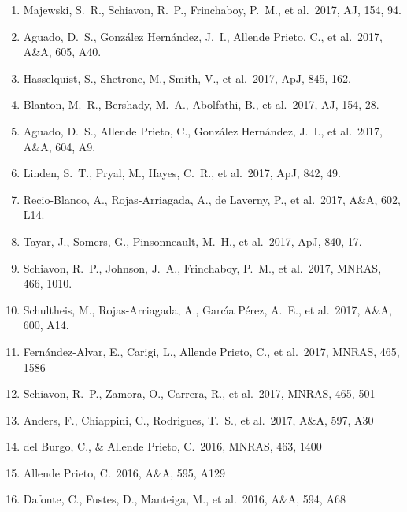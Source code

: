 \documentclass[12pt]{article}
\newcommand{\aj}{AJ}
\newcommand{\apj}{ApJ}
\newcommand{\mnras}{MNRAS}
\newcommand{\aap}{A\&A}
\begin{document}
\begin{enumerate}
\item Majewski, S.~R., Schiavon, R.~P., Frinchaboy, P.~M., et al.\ 2017, \aj, 154, 94.

\item Aguado, D.~S., Gonz{\'a}lez Hern{\'a}ndez, J.~I., Allende Prieto, C., et al.\ 2017, \aap, 605, A40. 

\item Hasselquist, S., Shetrone, M., Smith, V., et al.\ 2017, \apj, 845, 162. 

\item Blanton, M.~R., Bershady, M.~A., Abolfathi, B., et al.\ 2017, \aj, 154, 28. 

\item Aguado, D.~S., Allende Prieto, C., Gonz{\'a}lez Hern{\'a}ndez, J.~I., et al.\ 2017, \aap, 604, A9. 

\item Linden, S.~T., Pryal, M., Hayes, C.~R., et al.\ 2017, \apj, 842, 49. 


\item Recio-Blanco, A., Rojas-Arriagada, A., de Laverny, P., et al.\ 2017, \aap, 602, L14. 

\item Tayar, J., Somers, G., Pinsonneault, M.~H., et al.\ 2017, \apj, 840, 17. 

\item Schiavon, R.~P., Johnson, J.~A., Frinchaboy, P.~M., et al.\ 2017, \mnras, 466, 1010.

\item Schultheis, M., Rojas-Arriagada, A., Garc{\'\i}a P{\'e}rez, A.~E., et al.\ 2017, A\&A, 600, A14. 

\item Fern{\'a}ndez-Alvar, E., Carigi, L., Allende Prieto, C., et al.\ 2017, MNRAS, 465, 1586 


\item Schiavon, R.~P., Zamora, O., Carrera, R., et al.\ 2017, MNRAS, 465, 501 


\item Anders, F., Chiappini, C., Rodrigues, T.~S., et al.\ 2017, A\&A, 597, A30 


\item del Burgo, C., \& Allende Prieto, C.\ 2016, MNRAS, 463, 1400 


\item Allende Prieto, C.\ 2016, A\&A, 595, A129 


\item Dafonte, C., Fustes, D., Manteiga, M., et al.\ 2016, A\&A, 594, A68 



\end{enumerate}
\end{document}
